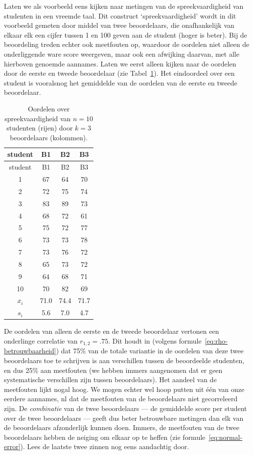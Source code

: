 \documentclass[
]{book}
\begin{document}
Laten we als voorbeeld eens kijken naar metingen van de
spreekvaardigheid van studenten in een vreemde taal. Dit construct
`spreekvaardigheid' wordt in dit voorbeeld gemeten door middel van twee
beoordelaars, die onafhankelijk van elkaar elk een cijfer tussen 1 en
100 geven aan de student (hoger is beter). Bij de beoordeling treden
echter ook meetfouten op, waardoor de oordelen niet alleen de
onderliggende ware score weergeven, maar ook een afwijking daarvan, met
alle hierboven genoemde aannames. Laten we eerst alleen kijken naar de
oordelen door de eerste en tweede beoordelaar (zie
Tabel~\ref{tab:betrouwbaarheid}). Het eindoordeel over een student is
vooralsnog het gemiddelde van de oordelen van de eerste en tweede
beoordelaar.

\begin{longtable}[]{@{}cccc@{}}
\caption{\label{tab:betrouwbaarheid} Oordelen over spreekvaardigheid van \(n = 10\) studenten (rijen) door
\(k = 3\) beoordelaars (kolommen).}\tabularnewline
\toprule
student & B1 & B2 & B3\tabularnewline
\midrule
\endfirsthead
\toprule
student & B1 & B2 & B3\tabularnewline
\midrule
\endhead
1 & 67 & 64 & 70\tabularnewline
2 & 72 & 75 & 74\tabularnewline
3 & 83 & 89 & 73\tabularnewline
4 & 68 & 72 & 61\tabularnewline
5 & 75 & 72 & 77\tabularnewline
6 & 73 & 73 & 78\tabularnewline
7 & 73 & 76 & 72\tabularnewline
8 & 65 & 73 & 72\tabularnewline
9 & 64 & 68 & 71\tabularnewline
10 & 70 & 82 & 69\tabularnewline
\(\overline{x_i}\) & 71.0 & 74.4 & 71.7\tabularnewline
\(s_i\) & 5.6 & 7.0 & 4.7\tabularnewline
\bottomrule
\end{longtable}

De oordelen van alleen de eerste en de tweede beoordelaar vertonen een
onderlinge correlatie van \(r_{1,2}=.75\). Dit houdt in (volgens
formule~\eqref{eq:rho-betrouwbaarheid}) dat 75\% van de totale variantie in
de oordelen van deze twee beoordelaars toe te schrijven is aan
verschillen tussen de beoordeelde studenten, en dus 25\% aan meetfouten
(we hebben immers aangenomen dat er geen systematische verschillen zijn
tussen beoordelaars). Het aandeel van de meetfouten lijkt nogal hoog. We
mogen echter wel hoop putten uit één van onze eerdere aannames, nl dat
de meetfouten van de beoordelaars niet gecorreleerd zijn. De
\emph{combinatie} van de twee beoordelaars --- de gemiddelde score per
student over de twee beoordelaars --- geeft dus beter betrouwbare
metingen dan elk van de beoordelaars afzonderlijk kunnen doen. Immers,
de meetfouten van de twee beoordelaars hebben de neiging om elkaar op te
heffen (zie formule~\eqref{eq:normal-error}).
Lees de laatste twee zinnen nog eens aandachtig door.
\end{document}
